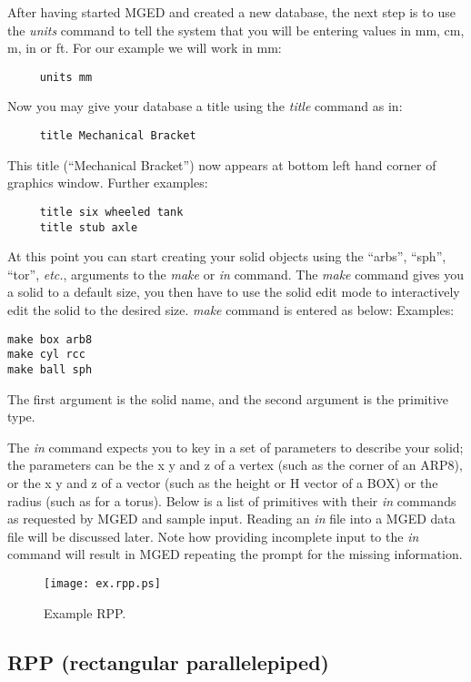 After having started MGED and created a new database, the next
step is to use the {\em units} command to tell the system that you will
be entering values in mm, cm, m, in or ft.  For our example we will
work in mm:

\begin{verbatim}
     units mm
\end{verbatim}

Now you may give your database a title using the {\em title} command as in:

\begin{verbatim}
     title Mechanical Bracket
\end{verbatim}

This title (``Mechanical Bracket'') now appears at bottom left hand
corner of graphics window.  Further examples:
\begin{verbatim}
     title six wheeled tank
     title stub axle
\end{verbatim}

At this point you can start creating your solid objects using the ``arbs'',
``sph'', ``tor'', {\em etc.},
arguments to the {\em make} or {\em in} command.
The {\em make} command gives you a solid to a default size,
you then have to use the
solid edit mode to interactively edit the solid to the desired size.
{\em make} command is entered as below:
Examples:
\begin{verbatim}
make box arb8
make cyl rcc
make ball sph
\end{verbatim}
The first argument is the solid name, and the second argument is
the primitive type.

The {\em in} command expects you to key in a set of parameters to describe your
solid; the parameters can be the x y and z of a vertex (such as the
corner of an ARP8), or the x y and z of a vector (such as the height
or H vector of a BOX) or the radius (such as for a torus).
Below is a list of primitives
with their {\em in} commands as requested by MGED and sample input.
Reading an {\em in} file into a MGED data file will be discussed later.
Note how providing incomplete input to the {\em in} command will result
in MGED repeating the prompt for the missing information.

\begin{figure}
\centering \texttt{[image: ex.rpp.ps]}
\caption{Example RPP.}
\label{ex.rpp}
\end{figure}

\subsection{RPP (rectangular parallelepiped)}

